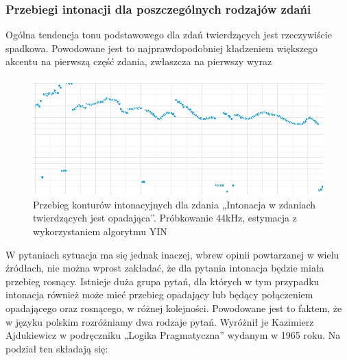 \documentclass[a4paper,12 pt]{article}
\begin{document}
\subsubsection{Przebiegi intonacji dla poszczególnych rodzajów zdańi}
Ogólna tendencja tonu podstawowego dla zdań twierdzących jest rzeczywiście spadkowa. Powodowane jest to najprawdopodobniej kładzeniem większego akcentu na pierwszą część zdania, zwłaszcza na pierwszy wyraz
\begin{figure}[h]
\centering
\includegraphics[scale=0.7]{zdanie_twierdzace.png}
\caption{Przebieg konturów intonacyjnych dla zdania „Intonacja w zdaniach twierdzących jest opadająca”. Próbkowanie 44kHz, estymacja z wykorzystaniem algorytmu YIN}
\end{figure}
\FloatBarrier
W pytaniach sytuacja ma się jednak inaczej, wbrew opinii powtarzanej w wielu źródłach, nie można wprost zakładać, że dla pytania intonacja będzie miała przebieg rosnący. Istnieje duża grupa pytań, dla których w tym przypadku intonacja również może mieć przebieg opadający lub będący połączeniem opadającego oraz rosnącego, w różnej kolejności. Powodowane jest to faktem, że w języku polskim rozróżniamy dwa rodzaje pytań. Wyróżnił je Kazimierz Ajdukiewicz w podręczniku „Logika Pragmatyczna” wydanym w 1965 roku.
Na podział ten składają się:
\end{document}
